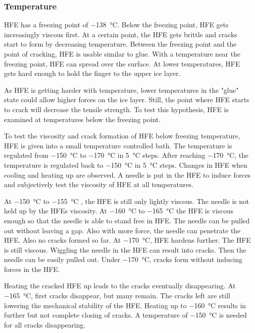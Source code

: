 \subsubsection{Temperature}

HFE has a freezing point of \SI{-138}{\degreeCelsius}. Below the freezing point, HFE gets increasingly viscous first. At a certain point, the HFE gets brittle and cracks start to form by decreasing temperature. Between the freezing point and the point of cracking, HFE is usable similar to glue. With a temperature near the freezing point, HFE can spread over the surface. At lower temperatures, HFE gets hard enough to hold the finger to the upper ice layer.

As HFE is getting harder with temperature, lower temperatures in the "glue" state could allow higher forces on the ice layer. Still, the point where HFE starts to crack will decrease the tensile strength. To test this hypothesis, HFE is examined at temperatures below the freezing point.

To test the viscosity and crack formation of HFE below freezing temperature, HFE is given into a small temperature controlled bath. The temperature is regulated from \SI{-150}{\degreeCelsius} to \SI{-170}{\degreeCelsius} in \SI{5}{\degreeCelsius} steps. After reaching \SI{-170}{\degreeCelsius}, the temperature is regulated back to \SI{-150}{\degreeCelsius} in \SI{5}{\degreeCelsius} steps. Changes in HFE when cooling and heating up are observed. A needle is put in the HFE to induce forces and subjectively test the viscosity of HFE at all temperatures.

At \SI{-150}{\degreeCelsius} to \SI{-155}{\degreeCelsius} , the HFE is still only lightly viscous. The needle is not held up by the HFEs viscosity. At \SI{-160}{\degreeCelsius} to  \SI{-165}{\degreeCelsius} the HFE is viscous enough so that the needle is able to stand free in HFE. The needle can be pulled out without leaving a gap. Also with more force, the needle can penetrate the HFE. Also no cracks formed so far. At \SI{-170}{\degreeCelsius}, HFE hardens further. The HFE is still viscous. Wiggling the needle in the HFE can result into cracks. Then the needle can be easily pulled out. Under \SI{-170}{\degreeCelsius}, cracks form without inducing forces in the HFE.

Heating the cracked HFE up leads to the cracks eventually disappearing. At \SI{-165}{\degreeCelsius}, first cracks disappear, but many remain. The cracks left are still lowering the mechanical stability of the HFE. Heating up to \SI{-160}{\degreeCelsius} results in further but not complete closing of cracks. A temperature of \SI{-150}{\degreeCelsius} is needed for all cracks disappearing.

